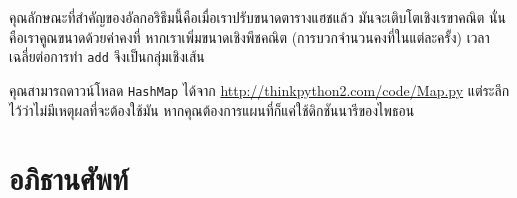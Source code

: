 คุณลักษณะที่สำคัญของอัลกอริธึมนี้คือเมื่อเราปรับขนาดตารางแฮชแล้ว มันจะเติบโตเชิงเรขาคณิต 
นั่นคือเราคูณขนาดด้วยค่าคงที่ 
หากเราเพิ่มขนาดเชิงพีชคณิต (การบวกจำนวนคงที่ในแต่ละครั้ง) เวลาเฉลี่ยต่อการทำ {\tt add} จึงเป็นกลุ่มเชิงเส้น


คุณสามารถดาวน์โหลด \texttt{HashMap} ได้จาก \url{http://thinkpython2.com/code/Map.py} 
แต่ระลึกไว้ว่าไม่มีเหตุผลที่จะต้องใช้มัน หากคุณต้องการแผนที่ก็แค่ใช้ดิกชันนารีของไพธอน

\section{อภิธานศัพท์}

